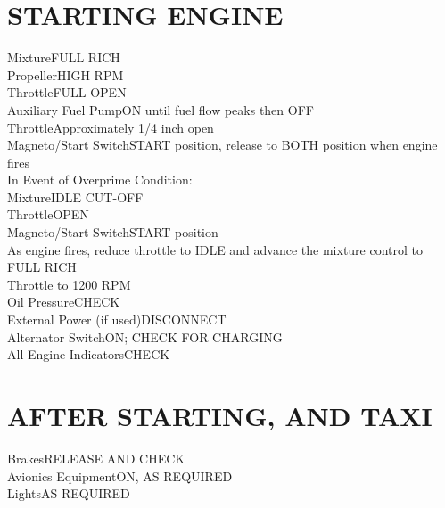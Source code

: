 \documentclass{article}
\begin{document}
\begin{multicols*}{2}
\section*{STARTING ENGINE}
Mixture\dotfill FULL RICH\\
Propeller\dotfill HIGH RPM\\
Throttle\dotfill FULL OPEN\\
Auxiliary Fuel Pump\dotfill ON until fuel flow peaks then OFF\\
Throttle\dotfill Approximately 1/4 inch open\\
Magneto/Start Switch\dotfill START position, release to BOTH position when engine fires\\
In Event of Overprime Condition:\\
\hspace*{6mm} Mixture\dotfill IDLE CUT-OFF\\
\hspace*{6mm} Throttle\dotfill OPEN\\
\hspace*{6mm} Magneto/Start Switch\dotfill START position\\
\hspace*{6mm} As engine fires, reduce throttle to IDLE and advance the mixture control to FULL RICH\\
Throttle to 1200 RPM\\
Oil Pressure\dotfill CHECK\\
External Power (if used)\dotfill DISCONNECT\\
Alternator Switch\dotfill ON; CHECK FOR CHARGING\\
All Engine Indicators\dotfill CHECK
\section*{AFTER STARTING, AND TAXI}
Brakes\dotfill RELEASE AND CHECK\\
Avionics Equipment\dotfill ON, AS REQUIRED\\
Lights\dotfill AS REQUIRED

\end{multicols*}
\end{document}
